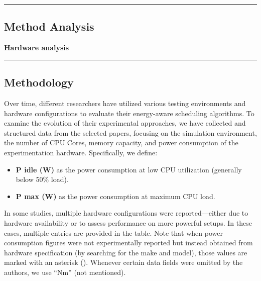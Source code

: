 {\color{gray}\hrule}
\begin{center}
\section{Method Analysis}
\textbf{Hardware analysis}
\bigskip
\end{center}
{\color{gray}\hrule}

\begin{multicols}{2}
\subsection{Methodology}
Over time, different researchers have utilized various testing environments and hardware configurations to evaluate their energy-aware scheduling algorithms. To examine the evolution of their experimental approaches, we have collected and structured data from the selected papers, focusing on the simulation environment, the number of CPU Cores, memory capacity, and power consumption of the experimentation hardware. Specifically, we define:
\begin{itemize}
    \item \textbf{P idle (W)} as the power consumption at low CPU utilization (generally below 50\% load).
    \item \textbf{P max (W)} as the power consumption at maximum CPU load.
\end{itemize}

In some studies, multiple hardware configurations were reported—either due to hardware availability or to assess performance on more powerful setups. In these cases, multiple entries are provided in the table. Note that when power consumption figures were not experimentally reported but instead obtained from hardware specification (by searching for the make and model), those values are marked with an asterisk (\textasteriskcentered). Whenever certain data fields were omitted by the authors, we use ``Nm'' (not mentioned).

\end{multicols}
